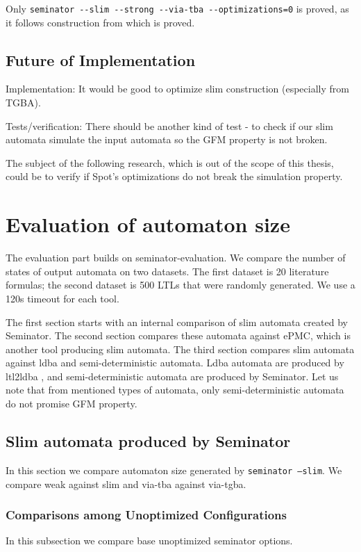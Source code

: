 \documentclass[
	digital,
nolof, nolot
]{fithesis3}
\begin{document}
	Only \texttt{seminator -{}-slim -{}-strong -{}-via-tba -{}-optimizations=0} is proved, as it follows construction from \cite{hlavni} which is proved.
	
	\section{Future of Implementation}
	Implementation:
	It would be good to optimize slim construction (especially from TGBA).
	
	
	
	Tests/verification:
	There should be another kind of test - to check if our slim automata simulate the input automata so the GFM property is not broken.
	
	The subject of the following research, which is out of the scope of this thesis, could be to verify if Spot's optimizations do not break the simulation property. 
	
	\chapter{Evaluation of automaton size}
	The evaluation part builds on seminator-evaluation. We compare the number of states of output automata on two datasets. The first dataset is 20 literature formulas; the second dataset is 500 LTLs that were randomly generated. We use a 120s timeout for each tool.
	
	The first section starts with an internal comparison of slim automata created by Seminator. The second section compares these automata against ePMC\cite{epmc}, which is another tool producing slim automata. The third section compares slim automata against ldba and semi-deterministic automata. Ldba automata are produced by ltl2ldba \cite{ltl2ldba}, and semi-deterministic automata are produced by Seminator. Let us note that from mentioned types of automata, only semi-deterministic automata do not promise GFM property.
	
	\section{Slim automata produced by Seminator}
	In this section we compare automaton size generated by \texttt{seminator --slim}.
	We compare weak against slim and via-tba against via-tgba.
	\subsection{Comparisons among Unoptimized Configurations}
	In this subsection we compare base unoptimized seminator options.
	
\end{document}
